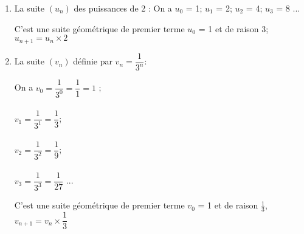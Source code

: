 \documentclass[12pt,a4paper]{article}
\date{}
\title{}
\begin{document}

%
%
%
%
%
%
%
%
%



\begin{myex}
	\begin{enumerate}
		\item La suite $(u_n)$ des puissances de 2 :
		On a $u_0$ = 1; $u_1$ = 2; $u_2$ = 4; $u_3$ = 8 ...
		
		C'est une suite géométrique de premier terme $u_0$ = 1 et de raison 3; \\ $u_{n+1} = u_n \times 2 $
		
		\item La suite $(v_n)$ définie par $v_n = \dfrac{1}{3^n}$: 
		
		\begin{multicols}{2}
			On a $v_0 = \dfrac{1}{3^0}  = \dfrac{1}{1} = 1$ ; \\ \\
			$v_1 = \dfrac{1}{3^1} = \dfrac{1}{3}$; \\ \\
			$v_2 = \dfrac{1}{3^2} = \dfrac{1}{9}$; \\ \\
			$v_3 = \dfrac{1}{3^3} = \dfrac{1}{27}$ ...
		\end{multicols}
		
		C'est une suite géométrique de premier terme $v_0$ = 1 et de raison $\frac{1}{3}$,\\ $v_{n+1} = v_n \times \dfrac{1}{3} $
	\end{enumerate}
\end{myex}	
\end{document}

